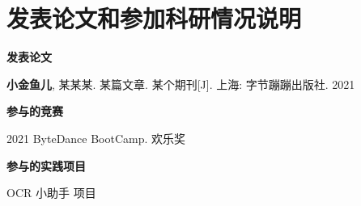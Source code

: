 
\chapter*{发表论文和参加科研情况说明}

\setlength{\parindent}{0em}

\textbf{发表论文}
\begin{publist}
	\item \textbf{小金鱼儿}, 某某某. 某篇文章. 某个期刊[J]. 上海: 字节蹦蹦出版社. 2021
\end{publist}

\vspace*{1em}

\textbf{参与的竞赛}
\begin{publist}
	\item 2021 ByteDance BootCamp. 欢乐奖
\end{publist}

\vspace*{1em}

\textbf{参与的实践项目}
\begin{publist}
	\item OCR 小助手 项目
\end{publist}

\setlength{\parindent}{2em}
